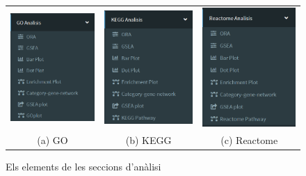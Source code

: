 \documentclass[]{article}
\begin{document}
\begin{figure}[h!]
\centering
\begin{tabular}{ccc}
\includegraphics[width=45mm]{App_F2_Items_GO.png} & 
\includegraphics[width=45mm]{App_F3_Items_KEGG.png} &
\includegraphics[width=45mm]{App_F4_Items_RA.png} \\
(a) GO & (b) KEGG & (c) Reactome \\
\end{tabular}
\caption{Els elements de les seccions d'anàlisi}
\end{figure}
\end{document}
